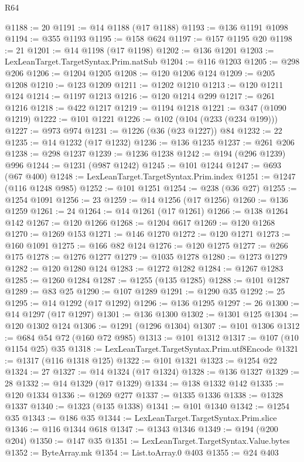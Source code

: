 \begin{lexlean}{R64}
\begin{coremodule}
@1188 := 20
@1191 := @14 @1188 (@17 @1188)
@1193 := @136 @1191 @1098
@1194 := @355 @1193
@1195 := @158 @624
@1197 := @157 @1195 @20
@1198 := 21
@1201 := @14 @1198 (@17 @1198)
@1202 := @136 @1201
@1203 := LexLeanTarget.TargetSyntax.Prim.natSub
@1204 := @116 @1203
@1205 := @298 @206
@1206 := @1204 @1205
@1208 := @120 @1206 @124
@1209 := @205 @1208
@1210 := @123 @1209
@1211 := @1202 @1210
@1213 := @120 @1211 @124
@1214 := @1197 @1213
@1216 := @120 @1214 @299
@1217 := @261 @1216
@1218 := @422 @1217
@1219 := @1194 @1218
@1221 := @347 (@1090 @1219)
@1222 := @101 @1221
@1226 := @102 (@104 (@233 (@234 @199)))
@1227 := @973 @974
@1231 := @1226 (@36 (@23 @1227)) @84
@1232 := 22
@1235 := @14 @1232 (@17 @1232)
@1236 := @136 @1235
@1237 := @261 @206
@1238 := @298 @1237
@1239 := @1236 @1238
@1242 := @194 (@296 @1239) @996
@1244 := @1231 (@987 @1242)
@1245 := @101 @1244
@1247 := @693 (@67 @400)
@1248 := LexLeanTarget.TargetSyntax.Prim.index
@1251 := @1247 (@116 @1248 @985)
@1252 := @101 @1251
@1254 := @238 (@36 @27)
@1255 := @1254 @1091
@1256 := 23
@1259 := @14 @1256 (@17 @1256)
@1260 := @136 @1259
@1261 := 24
@1264 := @14 @1261 (@17 @1261)
@1266 := @138 @1264 @142
@1267 := @120 @1266
@1268 := @1204 @617
@1269 := @120 @1268
@1270 := @1269 @153
@1271 := @146 @1270
@1272 := @120 @1271
@1273 := @160 @1091
@1275 := @166 @82 @124
@1276 := @120 @1275
@1277 := @266 @175
@1278 := @1276 @1277
@1279 := @1035 @1278
@1280 := @1273 @1279
@1282 := @120 @1280 @124
@1283 := @1272 @1282
@1284 := @1267 @1283
@1285 := @1260 @1284
@1287 := @1255 (@135 @1285)
@1288 := @101 @1287
@1289 := @83 @25
@1290 := @107 @1289
@1291 := @1290 @35
@1292 := 25
@1295 := @14 @1292 (@17 @1292)
@1296 := @136 @1295
@1297 := 26
@1300 := @14 @1297 (@17 @1297)
@1301 := @136 @1300
@1302 := @1301 @125
@1304 := @120 @1302 @124
@1306 := @1291 (@1296 @1304)
@1307 := @101 @1306
@1312 := @684 @54 @72 (@160 @72 @985)
@1313 := @101 @1312
@1317 := @107 (@10 @1154 @25) @35
@1318 := LexLeanTarget.TargetSyntax.Prim.utf8Encode
@1321 := @1317 (@116 @1318 @125)
@1322 := @101 @1321
@1323 := @1254 @22
@1324 := 27
@1327 := @14 @1324 (@17 @1324)
@1328 := @136 @1327
@1329 := 28
@1332 := @14 @1329 (@17 @1329)
@1334 := @138 @1332 @142
@1335 := @120 @1334
@1336 := @1269 @277
@1337 := @1335 @1336
@1338 := @1328 @1337
@1340 := @1323 (@135 @1338)
@1341 := @101 @1340
@1342 := @1254 @35
@1343 := @186 @35
@1344 := LexLeanTarget.TargetSyntax.Prim.slice
@1346 := @116 @1344 @618
@1347 := @1343 @1346
@1349 := @194 (@200 @204)
@1350 := @147 @35
@1351 := LexLeanTarget.TargetSyntax.Value.bytes
@1352 := ByteArray.mk
@1354 := List.toArray.{0} @403
@1355 := @24 @403

\end{coremodule}
\end{lexlean}
